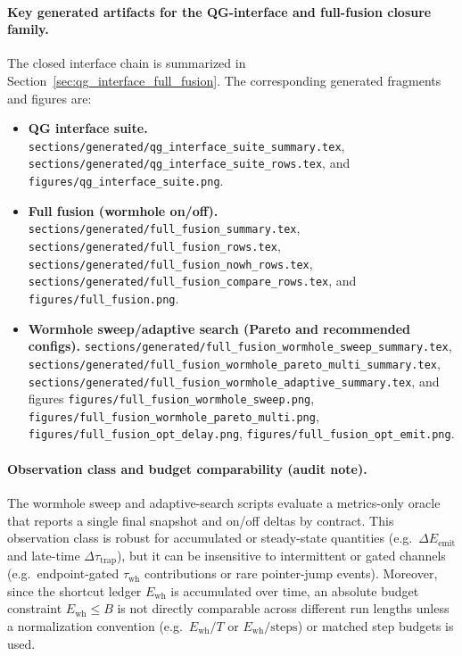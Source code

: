 \paragraph{Key generated artifacts for the QG-interface and full-fusion closure family.}
\AuditTag The closed interface chain is summarized in Section~\ref{sec:qg_interface_full_fusion}.
The corresponding generated fragments and figures are:
\begin{itemize}
\item \textbf{QG interface suite.}
  \texttt{sections/generated/qg\_interface\_suite\_summary.tex},
  \texttt{sections/generated/qg\_interface\_suite\_rows.tex},
  and \texttt{figures/qg\_interface\_suite.png}.
\item \textbf{Full fusion (wormhole on/off).}
  \texttt{sections/generated/full\_fusion\_summary.tex},
  \texttt{sections/generated/full\_fusion\_rows.tex},
  \texttt{sections/generated/full\_fusion\_nowh\_rows.tex},
  \texttt{sections/generated/full\_fusion\_compare\_rows.tex},
  and \texttt{figures/full\_fusion.png}.
\item \textbf{Wormhole sweep/adaptive search (Pareto and recommended configs).}
  \texttt{sections/generated/full\_fusion\_wormhole\_sweep\_summary.tex},
  \texttt{sections/generated/full\_fusion\_wormhole\_pareto\_multi\_summary.tex},
  \texttt{sections/generated/full\_fusion\_wormhole\_adaptive\_summary.tex},
  and figures \texttt{figures/full\_fusion\_wormhole\_sweep.png},
  \texttt{figures/full\_fusion\_wormhole\_pareto\_multi.png},
  \texttt{figures/full\_fusion\_opt\_delay.png},
  \texttt{figures/full\_fusion\_opt\_emit.png}.
\end{itemize}

\paragraph{Observation class and budget comparability (audit note).}
\AuditTag The wormhole sweep and adaptive-search scripts evaluate a metrics-only oracle that reports a single final snapshot and on/off deltas by contract.
This observation class is robust for accumulated or steady-state quantities (e.g.\ $\Delta E_{\mathrm{emit}}$ and late-time $\Delta\tau_{\mathrm{trap}}$), but it can be insensitive to intermittent or gated channels (e.g.\ endpoint-gated $\tau_{\mathrm{wh}}$ contributions or rare pointer-jump events).
\AuditTag Moreover, since the shortcut ledger $E_{\mathrm{wh}}$ is accumulated over time, an absolute budget constraint $E_{\mathrm{wh}}\le B$ is not directly comparable across different run lengths unless a normalization convention (e.g.\ $E_{\mathrm{wh}}/T$ or $E_{\mathrm{wh}}/\text{steps}$) or matched step budgets is used.

